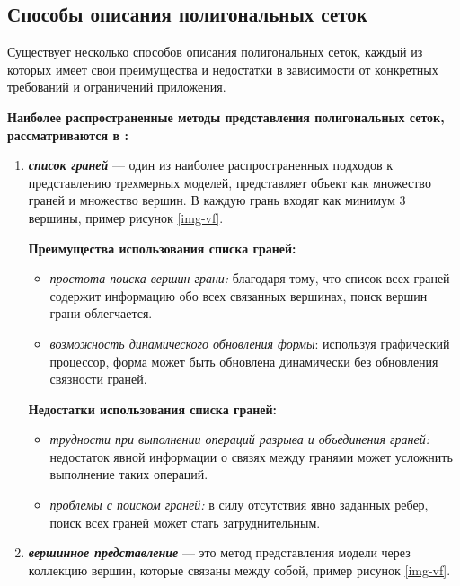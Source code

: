 \clearpage


\subsection{Способы описания полигональных сеток}

Существует несколько способов описания полигональных сеток, каждый из которых имеет свои преимущества и недостатки в зависимости от конкретных требований и ограничений приложения.

 \textbf{Наиболее распространенные методы представления полигональных сеток, рассматриваются в \cite{polygon_mesh}:}
 
\begin{enumerate}
	\item \textbf{\textit{список граней}} ---  один из наиболее распространенных подходов к представлению трехмерных моделей, представляет объект как множество граней и множество вершин. В каждую грань входят как минимум 3 вершины, пример рисунок  \ref{img-vf}.
	   
  	\textbf{Преимущества использования списка граней:}
  
	\begin{itemize}
		\item \textit{простота поиска вершин грани: }благодаря тому, что список всех граней содержит информацию обо всех связанных вершинах, поиск вершин грани облегчается.
		\item \textit{возможность динамического обновления формы}: используя графический процессор, форма может быть обновлена динамически без обновления связности граней.
	\end{itemize}
		
	\textbf{Недостатки использования списка граней:}
	
	\begin{itemize}
	\item\textit{ трудности при выполнении операций разрыва и объединения граней:} недостаток явной информации о связях между гранями может усложнить выполнение таких операций.
	\item \textit{проблемы с поиском граней: }в силу отсутствия явно заданных ребер, поиск всех граней может стать затруднительным.
	\end{itemize}
	


	
	\item \textit{\textbf{вершинное представление}} --- это метод представления модели через коллекцию вершин, которые связаны между собой, пример рисунок  \ref{img-vf}.


\end{enumerate}
